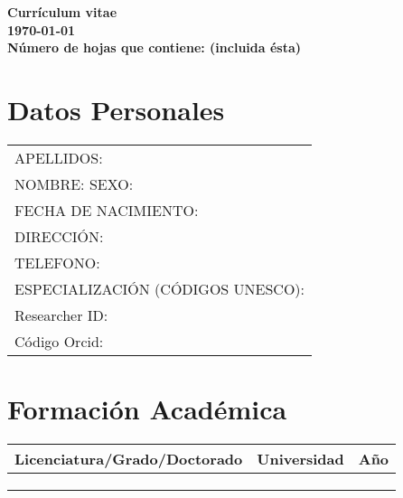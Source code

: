 \documentclass[9pt]{article}
\begin{document}



\thispagestyle{empty}

\mbox{ }

\vspace{4cm}

\vspace{1cm}
{\huge\bf }\\

{\huge\bf Currículum vitae}\\

{\huge\bf \today}\\

\bigskip
\medskip
{\Large \bf Número de hojas que contiene: \pageref{end} (incluida ésta)} \\


\newpage




\section*{Datos Personales}
\begin{tabular}{l}
  APELLIDOS:  \\
  NOMBRE:  SEXO:   \\
  FECHA DE NACIMIENTO:   \\
  DIRECCIÓN:  \\
  TELEFONO:  \\
  ESPECIALIZACIÓN (CÓDIGOS UNESCO):  \\
  Researcher ID:  \\
  Código Orcid: 
\end{tabular}

\section*{Formación Académica}
\begin{tabular}{lll}
  Licenciatura/Grado/Doctorado & Universidad & Año \\
  \hline
   &  &  \\
   &  &  \\
   &  & 
\end{tabular}
\end{document}

